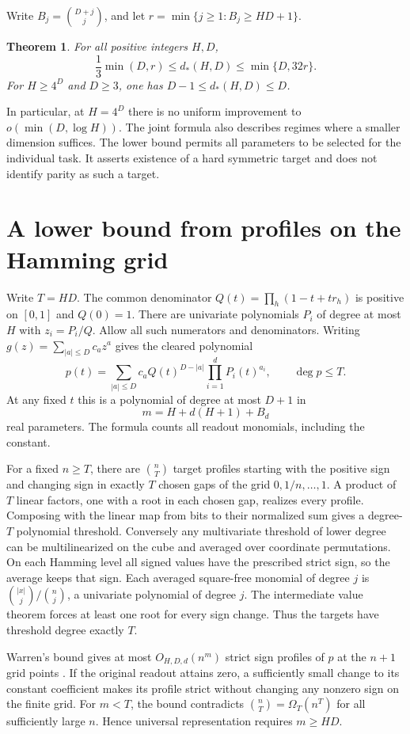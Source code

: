 \documentclass[11pt]{article}
\newtheorem{theorem}{Theorem}
\newcommand{\ds}{d_\ast}
\begin{document}
Write $B_j=\binom{D+j}{j}$, and let $r=\min\{j\ge1:B_j\ge HD+1\}$.
\begin{theorem}\label{main}
For all positive integers $H,D$,
\[
 \frac{1}{3}\min(D,r)\le\ds(H,D)\le \min\{D,32r\}.
\]
For $H\ge4^D$ and $D\ge3$, one has $D-1\le\ds(H,D)\le D$.
\end{theorem}
In particular, at $H=4^D$ there is no uniform improvement to $o(\min(D,\log H))$. The joint formula also describes regimes where a smaller dimension suffices. The lower bound permits all parameters to be selected for the individual task. It asserts existence of a hard symmetric target and does not identify parity as such a target.

\section{A lower bound from profiles on the Hamming grid}
Write $T=HD$. The common denominator $Q(t)=\prod_h(1-t+t r_h)$ is positive on $[0,1]$ and $Q(0)=1$. There are univariate polynomials $P_i$ of degree at most $H$ with $z_i=P_i/Q$. Allow all such numerators and denominators. Writing $g(z)=\sum_{|a|\le D}c_a z^a$ gives the cleared polynomial
\[
 p(t)=\sum_{|a|\le D}c_a Q(t)^{D-|a|}\prod_{i=1}^d P_i(t)^{a_i},\qquad \deg p\le T .
\]
At any fixed $t$ this is a polynomial of degree at most $D+1$ in
\[
 m=H+d(H+1)+B_d
\]
real parameters. The formula counts all readout monomials, including the constant.

For a fixed $n\ge T$, there are $\binom nT$ target profiles starting with the positive sign and changing sign in exactly $T$ chosen gaps of the grid $0,1/n,\ldots,1$. A product of $T$ linear factors, one with a root in each chosen gap, realizes every profile. Composing with the linear map from bits to their normalized sum gives a degree-$T$ polynomial threshold. Conversely any multivariate threshold of lower degree can be multilinearized on the cube and averaged over coordinate permutations. On each Hamming level all signed values have the prescribed strict sign, so the average keeps that sign. Each averaged square-free monomial of degree $j$ is $\binom{|x|}j/\binom nj$, a univariate polynomial of degree $j$. The intermediate value theorem forces at least one root for every sign change. Thus the targets have threshold degree exactly $T$.

Warren's bound gives at most $O_{H,D,d}(n^m)$ strict sign profiles of $p$ at the $n+1$ grid points \cite{warren}. If the original readout attains zero, a sufficiently small change to its constant coefficient makes its profile strict without changing any nonzero sign on the finite grid. For $m<T$, the bound contradicts $\binom nT=\Omega_T(n^T)$ for all sufficiently large $n$. Hence universal representation requires $m\ge HD$.
\end{document}
